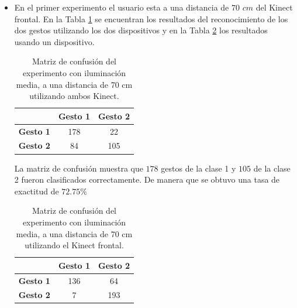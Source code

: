 \begin{itemize}

\item En el primer experimento el usuario esta a una distancia de $70$ $cm$ del Kinect frontal. En la Tabla \ref{table:70LMK2} se encuentran los resultados del reconocimiento de los dos gestos utilizando los dos dispositivos y en la Tabla \ref{table:70LMK1} los resultados usando un dispositivo.  


\begin{table}[h!] 
\begin{center}
\caption{Matriz de confusión del experimento con iluminación media, a una distancia de 70 cm utilizando ambos Kinect.}
\label{table:70LMK2} 
\renewcommand{\arraystretch}{1.2}
\begin{tabular}{ r || c  c }  
        & \textbf{Gesto 1} & \textbf{Gesto 2} \\ \hline \hline  
\textbf{Gesto 1} & 178    &  22     \\ \hline  
\textbf{Gesto 2} & 84     & 105     \\   
\end{tabular}
\end{center} 

\end{table}

La matriz de confusión muestra que $178$ gestos de la clase 1 y $105$ de la clase 2 fueron clasificados correctamente. De manera que se obtuvo una tasa de exactitud de $72.75 \%$ 

\begin{table}[h!] 
\begin{center} 
\caption{Matriz de confusión del experimento con iluminación media, a una distancia de 70 cm utilizando el Kinect frontal.} 
\label{table:70LMK1} 
\renewcommand{\arraystretch}{1.2}
\begin{tabular}{ r || c  c } 
        & \textbf{Gesto 1} & \textbf{Gesto 2} \\ \hline \hline  
\textbf{Gesto 1} & 136    &  64     \\ \hline  
\textbf{Gesto 2} & 7     &  193     \\   
\end{tabular}
\end{center} 
\end{table} 


\end{itemize}
